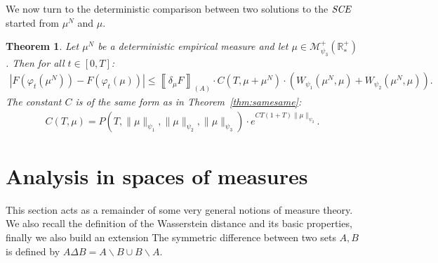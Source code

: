 \documentclass[11pt,a4paper]{article}
\newcommand{\RRP}{\mathbb{R}^+_*}
\newcommand{\MC}{\mathcal{M}}
\newcommand{\SCE}{\emph{SCE}}
\newcommand{\A}{(A)}
\newtheorem{theorem}{Theorem}[section]
\begin{document}
\medskip

We now turn to the deterministic comparison between two solutions to the $\SCE$ started from $\mu^N$ and $\mu$.

\begin{theorem}\label{thm:difdif}
    Let $\mu^N$ be a deterministic empirical measure and let $\mu \in \MC^+_{\psi_3}(\RRP)$. Then for all $t \in [0,T]$:
    \begin{align*}
        \left| F\left(\varphi_t(\mu^N)\right) - F\left(\varphi_t(\mu)\right) \right|
        \leq \left\llbracket \delta_\mu F \right\rrbracket_{\A} \cdot C(T,\mu + \mu^N) \cdot \left(W_{\psi_1}(\mu^N,\mu) + W_{\psi_2}(\mu^N,\mu)\right).
    \end{align*}
    The constant $C$ is of the same form as in Theorem~\ref{thm:samesame}:
    \begin{align*}
        C(T,\mu) = P\left(T,\|\mu\|_{\psi_1},\|\mu\|_{\psi_2},\|\mu\|_{\psi_3}\right) 
        \cdot e^{CT(1 + T)\|\mu\|_{\psi_2}}.
    \end{align*}
\end{theorem}

\section{Analysis in spaces of measures}\label{section:analysis-measures}
This section acts as a remainder of some very general notions of measure theory. We also recall the definition of the Wasserstein distance and its basic properties, finally we also build an extension 
The symmetric difference between two sets $A,B$ is defined by $A\Delta B = A\backslash B \cup B\backslash A$.
\end{document}
